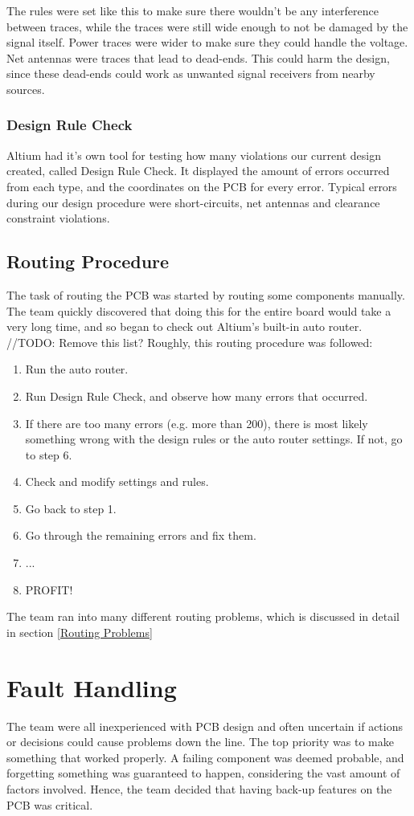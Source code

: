 The rules were set like this to make sure there wouldn't be any interference between traces, while the traces were still wide enough to not be damaged by the signal itself. 
Power traces were wider to make sure they could handle the voltage.
Net antennas were traces that lead to dead-ends. 
This could harm the design, since these dead-ends could work as unwanted signal receivers from nearby sources.

\subsubsection{Design Rule Check}
Altium had it's own tool for testing how many violations our current design created, called Design Rule Check. 
It displayed the amount of errors occurred from each type, and the coordinates on the PCB for every error. 
Typical errors during our design procedure were short-circuits, net antennas and clearance constraint violations.

\subsection{Routing Procedure}
The task of routing the PCB was started by routing some components manually. 
The team quickly discovered that doing this for the entire board would take a very long time, and so began to check out Altium's built-in auto router. 
//TODO: Remove this list?
Roughly, this routing procedure was followed:
\begin{enumerate}
\item Run the auto router.
\item Run Design Rule Check, and observe how many errors that occurred. 
\item If there are too many errors (e.g. more than 200), there is most likely something wrong with the design rules or the auto router settings. If not, go to step 6.
\item Check and modify settings and rules.
\item Go back to step 1.
\item Go through the remaining errors and fix them. 
\item ...
\item PROFIT!
\end{enumerate}

The team ran into many different routing problems, which is discussed in detail in section \ref{Routing Problems}

\section{Fault Handling}
The team were all inexperienced with PCB design and often uncertain if actions or decisions could cause problems down the line. 
The top priority was to make something that worked properly. 
A failing component was deemed probable, and forgetting something was guaranteed to happen, considering the vast amount of factors involved. 
Hence, the team decided that having back-up features on the PCB was critical.

